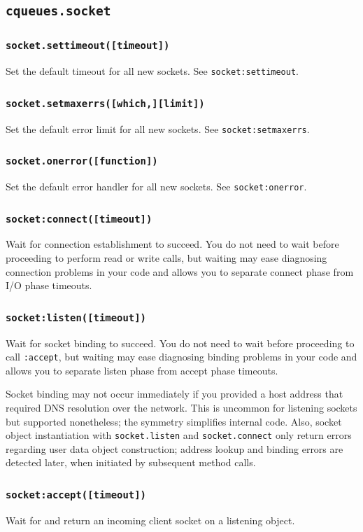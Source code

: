 \documentclass[11pt, oneside]{memoir}
\newcommand*{\fn}[1]{\texttt{#1}\xspace}
\newcounter{toccols}
\newenvironment{Module}[1]{
	\subsection{\texttt{#1}}
	\addtocontents{toc}{
		\protect\begin{multicols}{\value{toccols}}
	}
}{
	\addtocontents{toc}{\protect\end{multicols}}
}
\begin{document}
\begin{Module}{cqueues.socket}
\subsubsection[\fn{socket.settimeout}]{\fn{socket.settimeout([timeout])}}
	Set the default timeout for all new sockets. See \fn{socket:settimeout}.

\subsubsection[\fn{socket.setmaxerrs}]{\fn{socket.setmaxerrs([which,][limit])}}
	Set the default error limit for all new sockets. See \fn{socket:setmaxerrs}.

\subsubsection[\fn{socket.onerror}]{\fn{socket.onerror([function])}}
	Set the default error handler for all new sockets. See \fn{socket:onerror}.

\subsubsection[\fn{socket:connect}]{\fn{socket:connect([timeout])}}
Wait for connection establishment to succeed. You do not need to wait before proceeding to perform
read or write calls, but waiting may ease diagnosing connection problems in your code and allows you to separate connect phase from I/O phase timeouts.

\subsubsection[\fn{socket:listen}]{\fn{socket:listen([timeout])}}
Wait for socket binding to succeed. You do not need to wait before proceeding to call \fn{:accept}, but waiting may ease diagnosing binding problems in your code and allows you to separate listen phase from accept phase timeouts.

Socket binding may not occur immediately if you provided a host address that required DNS resolution over the network. This is uncommon for listening sockets but supported nonetheless; the symmetry simplifies internal code. Also, socket object instantiation with \fn{socket.listen} and \fn{socket.connect} only return errors regarding user data object construction; address lookup and binding errors are detected later, when initiated by subsequent method calls.

\subsubsection[\fn{socket:accept}]{\fn{socket:accept([timeout])}}
Wait for and return an incoming client socket on a listening object.


\end{Module}
\end{document}
